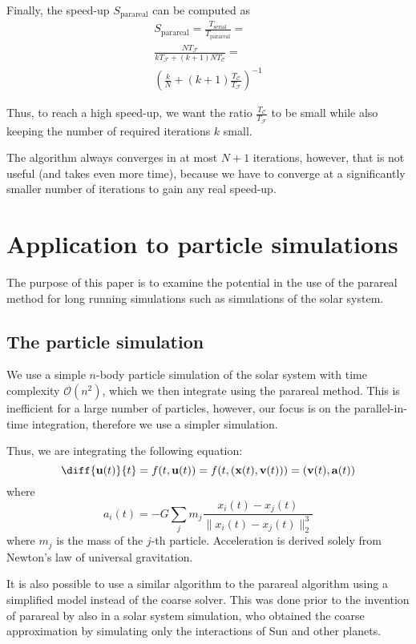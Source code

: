 \documentclass[conference]{IEEEtran}
\begin{document}
Finally, the speed-up $S_\text{parareal}$ can be computed as
\begin{multline}
S_\text{parareal} = \frac{T_\text{serial}}{T_\text{parareal}} = \\\frac{NT_\mathcal{F}}{kT_\mathcal{F} + (k+1)NT_\mathcal{C}} = \\\left(\frac{k}{N} + (k+1)\frac{T_\mathcal{C}}{T_\mathcal{F}}\right)^{-1}
\end{multline}

Thus, to reach a high speed-up, we want the ratio $\frac{T_\mathcal{C}}{T_\mathcal{F}}$ to be small while also keeping the number of required iterations $k$ small. \cite{speedup}

The algorithm always converges in at most $N+1$ iterations, however, that is not useful (and takes even more time), because we have to converge at a significantly smaller number of iterations to gain any real speed-up. \cite{speedup}

\section{Application to particle simulations}
The purpose of this paper is to examine the potential in the use of the parareal method for long running simulations such as simulations of the solar system. 

\subsection{The particle simulation}
We use a simple $n$-body particle simulation of the solar system with time complexity $\mathcal{O}(n^2)$, which we then integrate using the parareal method. This is inefficient for a large number of particles, however, our focus is on the parallel-in-time integration, therefore we use a simpler simulation.

Thus, we are integrating the following equation:
$$
\diff{\mathbf{u}(t)}{t} = f(t, \mathbf{u}(t)) = f(t, (\mathbf{x}(t), \mathbf{v}(t))) = (\mathbf{v}(t), \mathbf{a}(t))
$$
where 
$$
a_i(t) = -G \sum_j m_j\frac{x_i(t)-x_j(t)}{\|x_i(t)-x_j(t)\|_2^3}
$$
where $m_j$ is the mass of the $j$-th particle. Acceleration is derived solely from Newton's law of universal gravitation.

It is also possible to use a similar algorithm to the parareal algorithm using a simplified model instead of the coarse solver. This was done prior to the invention of parareal by \cite{parallelsolar} also in a solar system simulation, who obtained the coarse approximation by simulating only the interactions of Sun and other planets. \cite{parallelsolar} \cite{farfuture}
\end{document}
